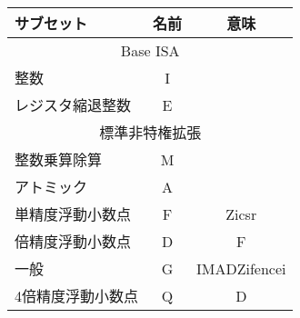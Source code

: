 \begin{table}[h]
\center
\begin{tabular}{|l|c|c|}
\hline
サブセット & 名前 & 意味 \\
\hline
\hline
\multicolumn{3}{|c|}{Base ISA}\\
\hline
整数 & I & \\
レジスタ縮退整数 & E & \\
\hline
\hline
\multicolumn{3}{|c|}{標準非特権拡張}\\
\hline
整数乗算除算 & M & \\
アトミック & A & \\
単精度浮動小数点 & F & Zicsr \\
倍精度浮動小数点 & D & F \\
\hline
一般 & G & IMADZifencei \\
\hline
4倍精度浮動小数点 & Q & D\\

\end{tabular}
\end{table}
